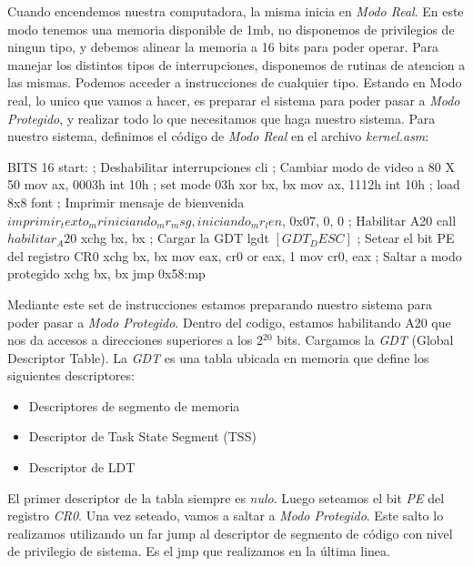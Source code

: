 Cuando encendemos nuestra computadora, la misma inicia en \textit{Modo Real}. En este modo tenemos una memoria disponible de 1mb, no disponemos de privilegios de ningun tipo, y debemos alinear la memoria a 16 bits para poder operar.
Para manejar los distintos tipos de interrupciones, disponemos de rutinas de atencion a las mismas. Podemos acceder a instrucciones de cualquier tipo.
Estando en Modo real, lo unico que vamos a hacer, es preparar el sistema para poder pasar a \textit{Modo Protegido}, y realizar todo lo que necesitamos que haga nuestro sistema.
Para nuestro sistema, definimos el c\'odigo de \textit{Modo Real} en el archivo \textit{kernel.asm}:

\begin{algorithmic}
\State \tab BITS 16
\State \tab start:
    \State \tab \tab ; Deshabilitar interrupciones
    \State \tab \tab cli
\newline
\State \tab \tab     ; Cambiar modo de video a 80 X 50
    \State \tab \tab mov ax, 0003h
    \State \tab \tab int 10h ; set mode 03h
    \State \tab \tab xor bx, bx
    \State \tab \tab mov ax, 1112h
    \State \tab \tab int 10h ; load 8x8 font
\newline
    \State \tab \tab ; Imprimir mensaje de bienvenida
    \State \tab \tab $imprimir_texto_mr iniciando_mr_msg, iniciando_mr_len$, 0x07, 0, 0
    \State \tab \tab ; Habilitar A20
    \State \tab \tab call $habilitar_A20$
    \State \tab \tab xchg bx, bx
    \State \tab \tab ; Cargar la GDT
    \State \tab \tab lgdt $[GDT_DESC]$
    \newline
    \State \tab \tab ; Setear el bit PE del registro CR0
    \State \tab \tab xchg bx, bx
    \State \tab \tab mov eax, cr0
    \State \tab \tab or eax, 1
    \State \tab \tab mov cr0, eax
    \newline
    \State \tab \tab ; Saltar a modo protegido
    \State \tab \tab xchg bx, bx
    \State \tab \tab jmp 0x58:mp
    
    \end{algorithmic}
    
Mediante este set de instrucciones estamos preparando nuestro sistema para poder pasar a \textit{Modo Protegido}.
Dentro del codigo, estamos habilitando A20 que nos da accesos a direcciones superiores a los 2$^{20}$ bits.\newline
Cargamos la \textit{GDT} (Global Descriptor Table).
La \textit{GDT} es una tabla ubicada en memoria que define los siguientes descriptores:
\begin{itemize}
    \item Descriptores de segmento de memoria
    \item Descriptor de Task State Segment (TSS)
    \item Descriptor de LDT
\end{itemize}
El primer descriptor de la tabla siempre es \textit{nulo}. Luego seteamos el bit \textit{PE} del registro \textit{CR0}.
\newline
Una vez seteado, vamos a saltar a \textit{Modo Protegido}. Este salto lo realizamos utilizando un far jump al descriptor de segmento de c\'odigo con nivel de privilegio de sistema. Es el jmp que realizamos en la \'ultima linea.

